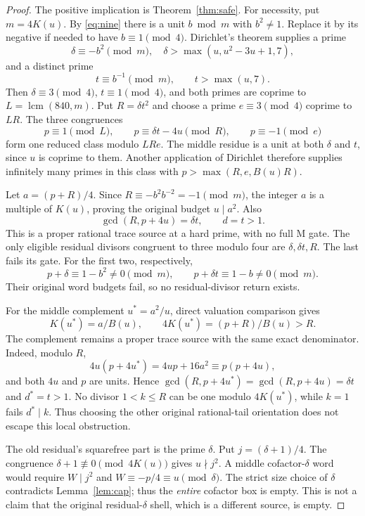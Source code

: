 \begin{proof}
The positive implication is Theorem~\ref{thm:safe}. For necessity, put
$m=4K(u)$. By \eqref{eq:nine} there is a unit $b\bmod m$ with $b^2\ne1$.
Replace it by its negative if needed to have $b\equiv1\pmod4$.
Dirichlet's theorem \cite[Theorem 18.1]{Dirichlet} supplies a prime
\[
 \delta\equiv-b^2\pmod m,
 \quad\delta>\max(u,u^2-3u+1,7),
\]
and a distinct prime
\[
 t\equiv b^{-1}\pmod m,\qquad t>\max(u,7).
\]
Then $\delta\equiv3\pmod4$, $t\equiv1\pmod4$, and both primes are coprime
to $L=\operatorname{lcm}(840,m)$. Put $R=\delta t^2$ and choose a prime
$e\equiv3\pmod4$ coprime to $LR$.
The three congruences
\begin{equation}\label{eq:AP}
 p\equiv1\pmod L,\qquad
 p\equiv\delta t-4u\pmod R,\qquad
 p\equiv-1\pmod e
\end{equation}
form one reduced class modulo $LRe$. The middle residue is a unit at both
$\delta$ and $t$, since $u$ is coprime to them. Another application of Dirichlet
therefore supplies infinitely many primes in this class with
$p>\max(R,e,B(u)R)$.

Let $a=(p+R)/4$. Since $R\equiv-b^2b^{-2}=-1\pmod m$, the integer $a$ is
a multiple of $K(u)$, proving the original budget $u\mid a^2$. Also
\[
 \gcd(R,p+4u)=\delta t,\qquad d=t>1.
\]
This is a proper rational trace source at a hard prime, with no full M gate.
The only eligible residual divisors congruent to three modulo four are
$\delta,\delta t,R$. The last fails its gate. For the first two, respectively,
\[
 p+\delta\equiv1-b^2\ne0\pmod m,
 \qquad p+\delta t\equiv1-b\ne0\pmod m.
\]
Their original word budgets fail, so no residual-divisor return exists.

For the middle complement $u^*=a^2/u$, direct valuation comparison gives
\[
 K(u^*)=a/B(u),\qquad 4K(u^*)=(p+R)/B(u)>R.
\]
The complement remains a proper trace source with the same exact denominator.
Indeed, modulo $R$,
\[
 4u(p+4u^*)=4up+16a^2\equiv p(p+4u),
\]
and both $4u$ and $p$ are units.  Hence
$\gcd(R,p+4u^*)=\gcd(R,p+4u)=\delta t$ and $d^*=t>1$.
No divisor $1<k\le R$ can be one modulo $4K(u^*)$, while $k=1$ fails
$d^*\mid k$. Thus choosing the other original rational-tail orientation does
not escape this local obstruction.

The old residual's squarefree part is the prime $\delta$. Put
$j=(\delta+1)/4$. The congruence $\delta+1\not\equiv0\pmod{4K(u)}$ gives
$u\nmid j^2$. A middle cofactor-$\delta$ word would require
$W\mid j^2$ and $W\equiv-p/4\equiv u\pmod\delta$.
The strict size choice of $\delta$ contradicts Lemma~\ref{lem:cap}; thus the
\emph{entire} cofactor box is empty. This is not a claim that the original
residual-$\delta$ shell, which is a different source, is empty.


\end{proof}
